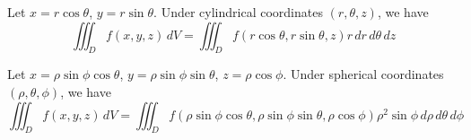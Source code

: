 \documentclass{huhtakm-template-book}
\begin{document}
\begin{thm}
    Let $x=r\cos\theta$, $y=r\sin\theta$. Under cylindrical coordinates $(r,\theta,z)$, we have
    \begin{equation*}
        \iiint_{D}f(x,y,z)\,dV=\iiint_{D}f(r\cos\theta,r\sin\theta,z)r\,dr\,d\theta\,dz
    \end{equation*}
\end{thm}
\begin{thm}
    Let $x=\rho\sin\phi\cos\theta$, $y=\rho\sin\phi\sin\theta$, $z=\rho\cos\phi$. Under spherical coordinates $(\rho,\theta,\phi)$, we have
    \begin{equation*}
        \iiint_{D}f(x,y,z)\,dV=\iiint_{D}f(\rho\sin\phi\cos\theta,\rho\sin\phi\sin\theta,\rho\cos\phi)\rho^{2}\sin\phi\,d\rho\,d\theta\,d\phi
    \end{equation*}
\end{thm}
\end{document}
